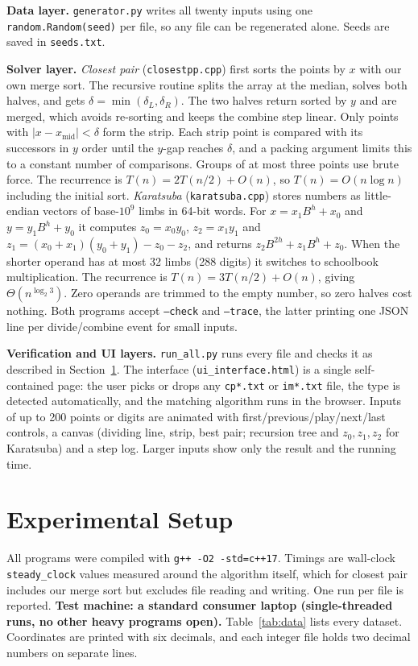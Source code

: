 \documentclass[10pt,twocolumn]{article}
\begin{document}
\textbf{Data layer.} \texttt{generator.py} writes all twenty inputs using one \texttt{random.Random(seed)} per file, so any file can be regenerated alone. Seeds are saved in \texttt{seeds.txt}.

\textbf{Solver layer.} \emph{Closest pair} (\texttt{closestpp.cpp}) first sorts the points by $x$ with our own merge sort. The recursive routine splits the array at the median, solves both halves, and gets $\delta=\min(\delta_L,\delta_R)$. The two halves return sorted by $y$ and are merged, which avoids re-sorting and keeps the combine step linear. Only points with $|x-x_{\text{mid}}|<\delta$ form the strip. Each strip point is compared with its successors in $y$ order until the $y$-gap reaches $\delta$, and a packing argument limits this to a constant number of comparisons. Groups of at most three points use brute force. The recurrence is $T(n)=2T(n/2)+O(n)$, so $T(n)=O(n\log n)$ including the initial sort. \emph{Karatsuba} (\texttt{karatsuba.cpp}) stores numbers as little-endian vectors of base-$10^9$ limbs in 64-bit words. For $x=x_1B^h+x_0$ and $y=y_1B^h+y_0$ it computes $z_0=x_0y_0$, $z_2=x_1y_1$ and $z_1=(x_0+x_1)(y_0+y_1)-z_0-z_2$, and returns $z_2B^{2h}+z_1B^h+z_0$. When the shorter operand has at most 32 limbs (288 digits) it switches to schoolbook multiplication. The recurrence is $T(n)=3T(n/2)+O(n)$, giving $\Theta(n^{\log_2 3})$. Zero operands are trimmed to the empty number, so zero halves cost nothing. Both programs accept \texttt{--check} and \texttt{--trace}, the latter printing one JSON line per divide/combine event for small inputs.

\textbf{Verification and UI layers.} \texttt{run\_all.py} runs every file and checks it as described in Section~\ref{sec:setup}. The interface (\texttt{ui\_interface.html}) is a single self-contained page: the user picks or drops any \texttt{cp*.txt} or \texttt{im*.txt} file, the type is detected automatically, and the matching algorithm runs in the browser. Inputs of up to 200 points or digits are animated with first/previous/play/next/last controls, a canvas (dividing line, strip, best pair; recursion tree and $z_0,z_1,z_2$ for Karatsuba) and a step log. Larger inputs show only the result and the running time.

\section{Experimental Setup}\label{sec:setup}
All programs were compiled with \texttt{g++ -O2 -std=c++17}. Timings are wall-clock \texttt{steady\_clock} values measured around the algorithm itself, which for closest pair includes our merge sort but excludes file reading and writing. One run per file is reported. \textbf{Test machine: a standard consumer laptop (single-threaded runs, no other heavy programs open).} Table~\ref{tab:data} lists every dataset. Coordinates are printed with six decimals, and each integer file holds two decimal numbers on separate lines.
\end{document}
